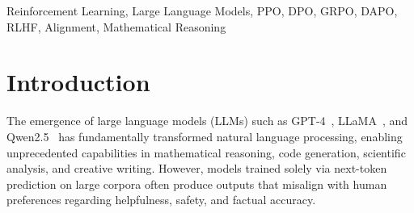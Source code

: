 \begin{abstract}
Reinforcement learning (RL) has become a cornerstone technique for aligning and enhancing large language models (LLMs). This survey provides a comprehensive and systematic analysis of four prominent RL algorithms used in LLM training: Proximal Policy Optimization (PPO), Direct Preference Optimization (DPO), Group Relative Policy Optimization (GRPO), and Dynamic Advantage Policy Optimization (DAPO). We present rigorous mathematical formulations for each algorithm, compare their architectural designs and computational requirements, and evaluate their empirical performance on mathematical reasoning benchmarks including AIME 2024. Our analysis reveals a clear evolutionary trajectory from value-based methods (PPO) to group-based methods (GRPO/DAPO), with each generation addressing critical limitations of its predecessor. Specifically, DAPO achieves 50\% accuracy on AIME 2024---a 67\% relative improvement over naive GRPO---through three key innovations: asymmetric Clip-Higher, dynamic sampling, and token-level loss normalization. We provide practical algorithm selection guidelines and identify open challenges for future research. To our knowledge, this is the first survey that unifies these four algorithms under a common mathematical framework with side-by-side experimental evaluation.
\end{abstract}

\begin{IEEEkeywords}
Reinforcement Learning, Large Language Models, PPO, DPO, GRPO, DAPO, RLHF, Alignment, Mathematical Reasoning
\end{IEEEkeywords}

\section{Introduction}
\label{sec:intro}

The emergence of large language models (LLMs) such as GPT-4~\cite{achiam2023gpt4}, LLaMA~\cite{touvron2023llama}, and Qwen2.5~\cite{yang2024qwen25} has fundamentally transformed natural language processing, enabling unprecedented capabilities in mathematical reasoning, code generation, scientific analysis, and creative writing. However, models trained solely via next-token prediction on large corpora often produce outputs that misalign with human preferences regarding helpfulness, safety, and factual accuracy.

